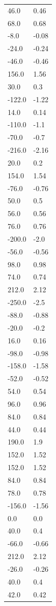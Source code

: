 \begin{longtable}{ll}
46.0 & 0.46 \\
68.0 & 0.68 \\
-8.0 & -0.08 \\
-24.0 & -0.24 \\
-46.0 & -0.46 \\
156.0 & 1.56 \\
30.0 & 0.3 \\
-122.0 & -1.22 \\
14.0 & 0.14 \\
-110.0 & -1.1 \\
-70.0 & -0.7 \\
-216.0 & -2.16 \\
20.0 & 0.2 \\
154.0 & 1.54 \\
-76.0 & -0.76 \\
50.0 & 0.5 \\
56.0 & 0.56 \\
76.0 & 0.76 \\
-200.0 & -2.0 \\
-56.0 & -0.56 \\
98.0 & 0.98 \\
74.0 & 0.74 \\
212.0 & 2.12 \\
-250.0 & -2.5 \\
-88.0 & -0.88 \\
-20.0 & -0.2 \\
16.0 & 0.16 \\
-98.0 & -0.98 \\
-158.0 & -1.58 \\
-52.0 & -0.52 \\
54.0 & 0.54 \\
96.0 & 0.96 \\
84.0 & 0.84 \\
44.0 & 0.44 \\
190.0 & 1.9 \\
152.0 & 1.52 \\
152.0 & 1.52 \\
84.0 & 0.84 \\
78.0 & 0.78 \\
-156.0 & -1.56 \\
0.0 & 0.0 \\
40.0 & 0.4 \\
-66.0 & -0.66 \\
212.0 & 2.12 \\
-26.0 & -0.26 \\
40.0 & 0.4 \\
42.0 & 0.42 \\

\end{longtable}
